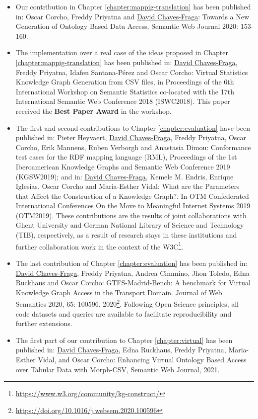 \begin{itemize}
    \item Our contribution in Chapter \ref{chapter:mappig-translation} has been published in: Oscar Corcho, Freddy Priyatna and \underline{David Chaves-Fraga}: Towards a New Generation of Ontology Based Data Access, Semantic Web Journal 2020: 153-160.
    \item The implementation over a real case of the ideas proposed in Chapter \ref{chapter:mappig-translation} has been published in: \underline{David Chaves-Fraga}, Freddy Priyatna, Idafen Santana-Pérez and Oscar Corcho: Virtual Statistics Knowledge Graph Generation from CSV files, in Proceedings of the 6th International Workshop on Semantic Statistics co-located with the 17th International Semantic Web Conference 2018 (ISWC2018). This paper received the \textbf{Best Paper Award} in the workshop.
    \item The first and second contributions to Chapter \ref{chapter:evaluation} have been published in: Pieter Heyvaert, \underline{David Chaves-Fraga}, Freddy Priyatna, Oscar Corcho, Erik Mannens, Ruben Verborgh and Anastasia Dimou: Conformance test cases for the RDF mapping language (RML), Proceedings of the 1st Iberoamerican Knowledge Graphs and Semantic Web Conference 2019 (KGSW2019); and in: \underline{David Chaves-Fraga}, Kemele M. Endris, Enrique Iglesias, Oscar Corcho and Maria-Esther Vidal: What are the Parameters that Affect the Construction of a Knowledge Graph?. In OTM Confederated International Conferences On the Move to Meaningful Internet Systems 2019 (OTM2019). These contributions are the results of joint collaborations with Ghent University and German National Library of Science and Technology (TIB), respectively, as a result of research stays in these institutions and further collaboration work in the context of the W3C\footnote{\url{https://www.w3.org/community/kg-construct/}}.
    \item The last contribution of Chapter \ref{chapter:evaluation} has been published in: \underline{David Chaves-Fraga}, Freddy Priyatna, Andrea Cimmino, Jhon Toledo, Edna Ruckhaus and Oscar Corcho: GTFS-Madrid-Bench: A benchmark for Virtual Knowledge Graph Access in the Transport Domain. Journal of Web Semantics 2020, 65: 100596. 2020\footnote{\url{https://doi.org/10.1016/j.websem.2020.100596}}. Following Open Science principles, all code datasets and queries are available to facilitate reproducibility and further extensions.
    \item The first part of our contribution to Chapter \ref{chapter:virtual} has been published in: \underline{David Chaves-Fraga}, Edna Ruckhaus, Freddy Priyatna, Maria-Esther Vidal, and Oscar Corcho: Enhancing Virtual Ontology Based Access over Tabular Data with Morph-CSV, Semantic Web Journal, 2021.

\end{itemize}
